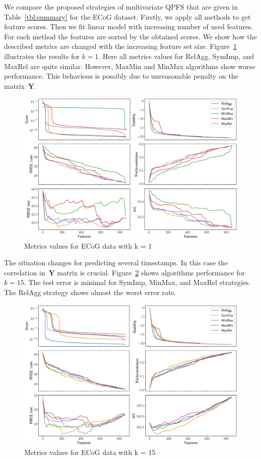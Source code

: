 \documentclass[12pt,twoside]{article}
\theoremstyle{definition}
\newcommand{\bY}{\mathbf{Y}}
\begin{document}
We compare the proposed strategies of multivariate QPFS that are given in Table~\ref{tbl:summary} for the ECoG dataset. 
Firstly, we apply all methods to get feature scores. 
Then we fit linear model with increasing number of used features. 
For each method the features are sorted by the obtained scores. 
We show how the described metrics are changed with the increasing feature set size. 
Figure~\ref{fig:ecog_3_1_metrics} illustrates the results for $k = 1$. 
Here all metrics values for RelAgg, SymImp, and MaxRel are quite similar. 
However, MaxMin and MinMax algorithms show worse performance. 
This behavious is possibly due to unreasonable penalty on the matrix~$\bY$.
\begin{figure}[h]
	\includegraphics[width=\linewidth]{figs/ecog_3_1_metrics.eps}
	\caption{Metrics values for ECoG data with k = 1}
	\label{fig:ecog_3_1_metrics}
\end{figure}

The situation changes for predicting several timestamps. 
In this case the correlation in~$\bY$ matrix is crucial. 
Figure~\ref{fig:ecog_3_15_metrics} shows algorithms performance for $k = 15$. 
The test error is minimal for SymImp, MinMax, and MaxRel strategies.  
The RelAgg strategy shows almost the worst error rate.

\begin{figure}[h]
	\includegraphics[width=\linewidth]{figs/ecog_3_15_metrics.eps}
	\caption{Metrics values for ECoG data with k = 15}
	\label{fig:ecog_3_15_metrics}
\end{figure}



\end{document}
